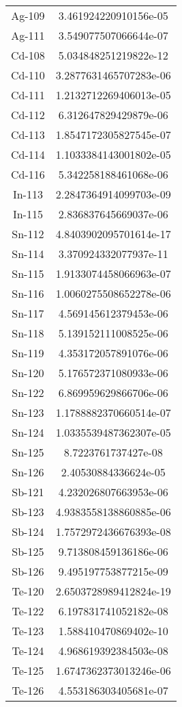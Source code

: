 \begin{table}[h!]
\begin{tabular}{|| c || c |}
Ag-109 & 3.461924220910156e-05 \\
Ag-111 & 3.549077507066644e-07 \\
Cd-108 & 5.034848251219822e-12 \\
Cd-110 & 3.2877631465707283e-06 \\
Cd-111 & 1.2132712269406013e-05 \\
Cd-112 & 6.312647829429879e-06 \\
Cd-113 & 1.8547172305827545e-07 \\
Cd-114 & 1.1033384143001802e-05 \\
Cd-116 & 5.342258188461068e-06 \\
In-113 & 2.2847364914099703e-09 \\
In-115 & 2.836837645669037e-06 \\
Sn-112 & 4.8403902095701614e-17 \\
Sn-114 & 3.370924332077937e-11 \\
Sn-115 & 1.9133074458066963e-07 \\
Sn-116 & 1.0060275508652278e-06 \\
Sn-117 & 4.569145612379453e-06 \\
Sn-118 & 5.139152111008525e-06 \\
Sn-119 & 4.353172057891076e-06 \\
Sn-120 & 5.176572371080933e-06 \\
Sn-122 & 6.869959629866706e-06 \\
Sn-123 & 1.1788882370660514e-07 \\
Sn-124 & 1.0335539487362307e-05 \\
Sn-125 & 8.7223761737427e-08 \\
Sn-126 & 2.40530884336624e-05 \\
Sb-121 & 4.232026807663953e-06 \\
Sb-123 & 4.9383558138860885e-06 \\
Sb-124 & 1.7572972436676393e-08 \\
Sb-125 & 9.713808459136186e-06 \\
Sb-126 & 9.495197753877215e-09 \\
Te-120 & 2.6503728989412824e-19 \\
Te-122 & 6.197831741052182e-08 \\
Te-123 & 1.588410470869402e-10 \\
Te-124 & 4.968619392384503e-08 \\
Te-125 & 1.6747362373013246e-06 \\
Te-126 & 4.553186303405681e-07 \\

\end{tabular}
\end{table}
